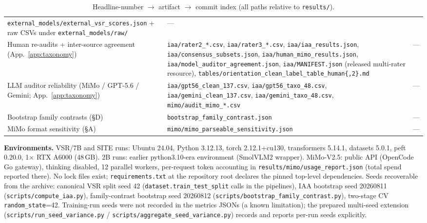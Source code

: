 \begin{table}[h]
\begin{tabular}{lll}
\texttt{external\_models/external\_vsr\_scores.json} + raw CSVs under
\texttt{external\_models/raw/} & --- \\
Human re-audits + inter-source agreement (App.~\ref{app:taxonomy}) &
\texttt{iaa/rater2\_*.csv}, \texttt{iaa/rater3\_*.csv},
\texttt{iaa/iaa\_results.json},
\texttt{iaa/consensus\_subsets.json},
\texttt{iaa/human\_mimo\_results.json},
\texttt{iaa/model\_auditor\_agreement.json},
\texttt{iaa/MANIFEST.json} (released multi-rater resource),
\texttt{tables/orientation\_clean\_label\_table\_human\{,2\}.md} &
--- \\
LLM auditor reliability (MiMo / GPT-5.6 / Gemini; App.~\ref{app:taxonomy}) &
\texttt{iaa/gpt56\_clean\_137.csv}, \texttt{iaa/gpt56\_taxo\_48.csv},
\texttt{iaa/gemini\_clean\_137.csv}, \texttt{iaa/gemini\_taxo\_48.csv},
\texttt{mimo/audit\_mimo\_*.csv} & --- \\
Bootstrap family contrasts (\S D) & \texttt{bootstrap\_family\_contrast.json} & --- \\
MiMo format sensitivity (\S A) & \texttt{mimo/mimo\_parseable\_sensitivity.json} & --- \\
\bottomrule
\end{tabular}
\caption{Headline-number $\rightarrow$ artifact $\rightarrow$ commit index (all
paths relative to \texttt{results/}).}
\label{tab:artifacts}
\end{table}

\textbf{Environments.} VSR/7B and SITE runs: Ubuntu 24.04, Python 3.12.13,
torch 2.12.1+cu130, transformers 5.14.1, datasets 5.0.1, peft 0.20.0, 1$\times$
RTX A6000 (48\,GB). 2B runs: earlier python3.10-era environment (SmolVLM2
wrapper). MiMo-V2.5: public API (OpenCode Go gateway), thinking disabled,
12 parallel workers, per-request token accounting in
\texttt{results/mimo/usage\_report.json} (total spend reported there).
No lock files exist; \texttt{requirements.txt} at the repository root
declares the pinned top-level dependencies. Seeds recoverable from the
archive: canonical VSR split seed 42 (\texttt{dataset.train\_test\_split}
calls in the pipelines), IAA bootstrap seed 20260811
(\texttt{scripts/compute\_iaa.py}), family-contrast bootstrap seed 20260812
(\texttt{scripts/bootstrap\_family\_contrast.py}), two-stage CV
\texttt{random\_state}{=}42. Training-run seeds were not recorded in the
metrics JSONs (a known limitation); the prepared multi-seed extension
(\texttt{scripts/run\_seed\_variance.py} /
\texttt{scripts/aggregate\_seed\_variance.py}) records and reports per-run
seeds explicitly.

